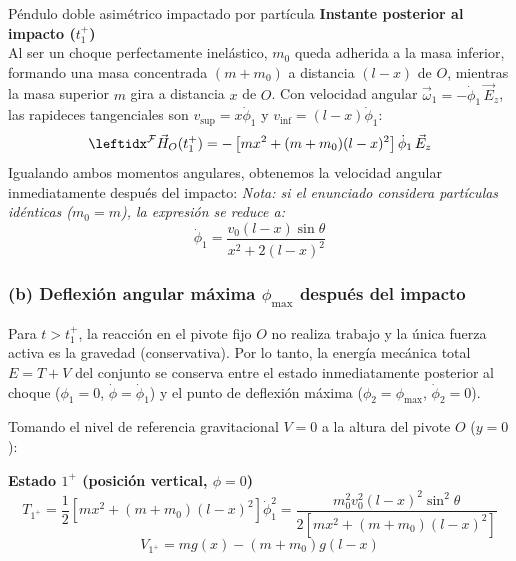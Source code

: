 \begin{solucion}{Péndulo doble asimétrico impactado por partícula}
\textbf{Instante posterior al impacto ($t_1^+$)}\\
Al ser un choque perfectamente inelástico, $m_0$ queda adherida a la masa inferior, formando una masa concentrada $(m + m_0)$ a distancia $(l - x)$ de $O$, mientras la masa superior $m$ gira a distancia $x$ de $O$. Con velocidad angular $\vec{\omega}_1 = -\dot{\phi}_1\,\vec{E}_z$, las rapideces tangenciales son $v_{\text{sup}} = x\dot{\phi}_1$ y $v_{\text{inf}} = (l - x)\dot{\phi}_1$:
$$\marc{\vec{H}_O(t_1^+)}{F}{} = -\left[ m x^2 + (m + m_0)(l - x)^2 \right] \dot{\phi}_1\,\vec{E}_z$$
Igualando ambos momentos angulares, obtenemos la velocidad angular inmediatamente después del impacto:
\emph{Nota: si el enunciado considera partículas idénticas ($m_0 = m$), la expresión se reduce a:}
$$\dot{\phi}_1 = \frac{v_0 (l - x)\sin\theta}{x^2 + 2(l - x)^2}$$


\subsubsection*{(b) Deflexión angular máxima $\phi_{\max}$ después del impacto}
Para $t > t_1^+$, la reacción en el pivote fijo $O$ no realiza trabajo y la única fuerza activa es la gravedad (conservativa). Por lo tanto, la energía mecánica total $E = T + V$ del conjunto se conserva entre el estado inmediatamente posterior al choque ($\phi_1 = 0$, $\dot{\phi} = \dot{\phi}_1$) y el punto de deflexión máxima ($\phi_2 = \phi_{\max}$, $\dot{\phi}_2 = 0$).

Tomando el nivel de referencia gravitacional $V = 0$ a la altura del pivote $O$ ($y = 0$):

\textbf{Estado $1^+$ (posición vertical, $\phi = 0$)}
$$T_{1^+} = \frac{1}{2}\left[ m x^2 + (m + m_0)(l - x)^2 \right] \dot{\phi}_1^2 = \frac{m_0^2 v_0^2 (l - x)^2 \sin^2\theta}{2\left[ m x^2 + (m + m_0)(l - x)^2 \right]}$$
$$V_{1^+} = mg(x) - (m + m_0)g(l - x)$$


\end{solucion}
